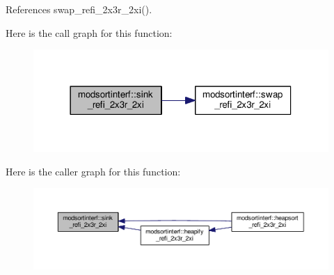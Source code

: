 References swap\-\_\-refi\-\_\-2x3r\-\_\-2xi().



Here is the call graph for this function\-:\nopagebreak
\begin{figure}[H]
\begin{center}
\leavevmode
\includegraphics[width=318pt]{classmodsortinterf_afda4964e3b16e63acf4ca8e2c1e08419_cgraph}
\end{center}
\end{figure}




Here is the caller graph for this function\-:\nopagebreak
\begin{figure}[H]
\begin{center}
\leavevmode
\includegraphics[width=350pt]{classmodsortinterf_afda4964e3b16e63acf4ca8e2c1e08419_icgraph}
\end{center}
\end{figure}


